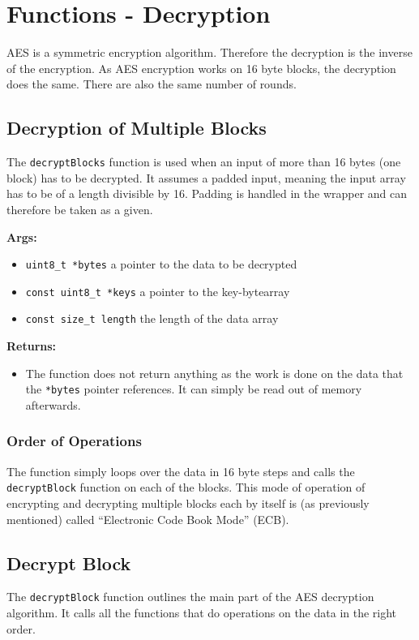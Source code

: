 \chapter{Functions - Decryption}
\label{ch:decryption}

AES is a symmetric encryption algorithm. Therefore the decryption is the inverse of the encryption. As AES encryption works on 16 byte blocks, the decryption does the same. There are also the same number of rounds.

\section{Decryption of Multiple Blocks}
\label{ch:dec_multipleblocks}
The \lstinline|decryptBlocks| function is used when an input of more than 16 bytes (one block) has to be decrypted. It assumes a padded input, meaning the input array has to be of a length divisible by 16. Padding is handled in the wrapper and can therefore be taken as a given.

\textbf{Args:}
\begin{itemize}
  \item \lstinline{uint8_t *bytes} a pointer to the data to be decrypted
  \item \lstinline{const uint8_t *keys} a pointer to the key-bytearray
  \item \lstinline{const size_t length} the length of the data array
\end{itemize}

\textbf{Returns:}
\begin{itemize}
  \item The function does not return anything as the work is done on the data that the \lstinline{*bytes} pointer references. It can simply be read out of memory afterwards.
\end{itemize}

\subsection{Order of Operations}
The function simply loops over the data in 16 byte steps and calls the \lstinline{decryptBlock} function on each of the blocks. This mode of operation of encrypting and decrypting multiple blocks each by itself is (as previously mentioned) called \enquote{Electronic Code Book Mode} (ECB).

\section{Decrypt Block}
\label{ch:dec_block}
The \lstinline{decryptBlock} function outlines the main part of the AES decryption algorithm. It calls all the functions that do operations on the data in the right order.

